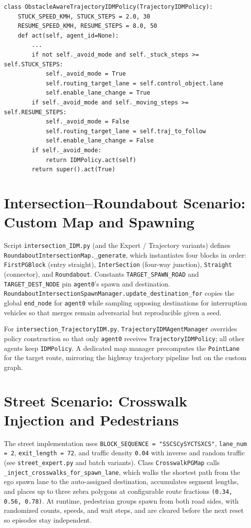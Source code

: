 \documentclass[12pt,a4paper]{report}
\begin{document}
\begin{lstlisting}[caption={Excerpt: obstacle-aware mode switching (\texttt{highway\_Trajectory.py}).},label={lst:trajavoid},float=H]
class ObstacleAwareTrajectoryIDMPolicy(TrajectoryIDMPolicy):
    STUCK_SPEED_KMH, STUCK_STEPS = 2.0, 30
    RESUME_SPEED_KMH, RESUME_STEPS = 8.0, 50
    def act(self, agent_id=None):
        ...
        if not self._avoid_mode and self._stuck_steps >= self.STUCK_STEPS:
            self._avoid_mode = True
            self.routing_target_lane = self.control_object.lane
            self.enable_lane_change = True
        if self._avoid_mode and self._moving_steps >= self.RESUME_STEPS:
            self._avoid_mode = False
            self.routing_target_lane = self.traj_to_follow
            self.enable_lane_change = False
        if self._avoid_mode:
            return IDMPolicy.act(self)
        return super().act(True)
\end{lstlisting}

\section{Intersection--Roundabout Scenario: Custom Map and Spawning}
Script \texttt{intersection\_IDM.py} (and the Expert / Trajectory variants) defines \texttt{RoundaboutIntersectionMap.\_generate}, which instantiates four blocks in order: \texttt{FirstPGBlock} (entry straight), \texttt{InterSection} (four-way junction), \texttt{Straight} (connector), and \texttt{Roundabout}. Constants \texttt{TARGET\_SPAWN\_ROAD} and \texttt{TARGET\_DEST\_NODE} pin \texttt{agent0}'s spawn and destination. \texttt{RoundaboutIntersectionSpawnManager.update\_destination\_for} copies the global \texttt{end\_node} for \texttt{agent0} while sampling opposing destinations for interruption vehicles so that merges remain adversarial but reproducible given a seed.

For \texttt{intersection\_TrajectoryIDM.py}, \texttt{TrajectoryIDMAgentManager} overrides policy construction so that only \texttt{agent0} receives \texttt{TrajectoryIDMPolicy}; all other agents keep \texttt{IDMPolicy}. A dedicated map manager precomputes the \texttt{PointLane} for the target route, mirroring the highway trajectory pipeline but on the custom graph.

\section{Street Scenario: Crosswalk Injection and Pedestrians}
The street implementation uses \texttt{BLOCK\_SEQUENCE = "SSCSCySYCTSXCS"}, \texttt{lane\_num = 2}, \texttt{exit\_length = 72}, and traffic density \texttt{0.04} with inverse and random traffic (see \texttt{street\_expert.py} and batch variants). Class \texttt{CrosswalkPGMap} calls \texttt{\_inject\_crosswalks\_for\_spawn\_lane}, which walks the shortest path from the ego spawn lane to the auto-assigned destination, accumulates segment lengths, and places up to three zebra polygons at configurable route fractions \texttt{(0.34, 0.56, 0.78)}. At runtime, pedestrian groups spawn from both road sides, with randomized counts, speeds, and wait steps, and are cleared before the next reset so episodes stay independent.
\end{document}
